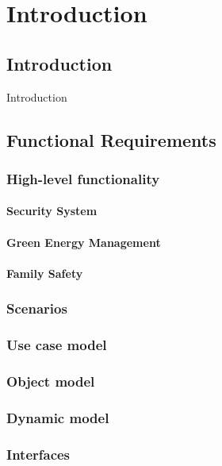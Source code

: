 \documentclass{report}
\begin{document}
\chapter{Introduction}

\section{Introduction}

Introduction

\section{Functional Requirements}

\subsection{High-level functionality}

\subsubsection{Security System}



\subsubsection{Green Energy Management}



\subsubsection{Family Safety}



\subsection{Scenarios}



\subsection{Use case model}



\subsection{Object model}



\subsection{Dynamic model}



\subsection{Interfaces}
\end{document}
